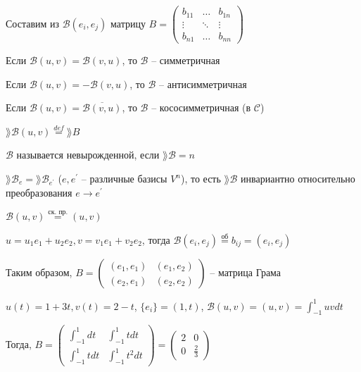 \documentclass[12pt]{article}
\begin{document}
    \Nota Составим из $\mathcal{B}(e_i, e_j)$ матрицу $B = \begin{pmatrix}b_{11} & \dots & b_{1n} \\ \vdots & \ddots & \vdots \\ b_{n1} & \dots & b_{nn}\end{pmatrix}$

     Если $\mathcal{B}(u, v) = \mathcal{B}(v, u)$, то $\mathcal{B}$ -- симметричная

     Если $\mathcal{B}(u, v) = -\mathcal{B}(v, u)$, то $\mathcal{B}$ -- антисимметричная

     Если $\mathcal{B}(u, v) = \overline{\mathcal{B}(v, u)}$, то $\mathcal{B}$ -- кососимметричная (в $\mathcal{C}$)

    \Def $\rang \mathcal{B}(u, v) \stackrel{def}{=} \rang B$

     $\mathcal{B}$ называется невырожденной, если $\rang \mathcal{B} = n$

     $\rang \mathcal{B}_e = \rang \mathcal{B}_{e^\prime} $ ($e, e^\prime$ -- различные базисы $V^n$), то есть $\rang \mathcal{B}$ инвариантно относительно преобразования $e \to e^\prime$

    \Ex $\mathcal{B}(u, v) \stackrel{\text{ск. пр.}}{=} (u, v)$

    $u = u_1 e_1 + u_2 e_2, v = v_1 e_1 + v_2 e_2$, тогда $\mathcal{B}(e_i, e_j) \stackrel{\text{об}}{=} b_{ij} = (e_i, e_j)$

    Таким образом, $B = \begin{pmatrix}(e_1, e_1) & (e_1, e_2) \\ (e_2, e_1) & (e_2, e_2)\end{pmatrix}$ -- матрица Грама

    \Ex $u(t) = 1 + 3t, v(t) = 2 - t$, $\{e_i\} = (1, t)$, $\mathcal{B}(u, v) = (u, v) = \int_{-1}^1 uv dt$

    Тогда, $B = \begin{pmatrix}\int_{-1}^1 dt & \int_{-1}^1 t dt \\ \int_{-1}^1 t dt & \int_{-1}^1 t^2 dt\end{pmatrix} = \begin{pmatrix}2 & 0 \\ 0 & \frac{2}{3}\end{pmatrix}$
\end{document}
